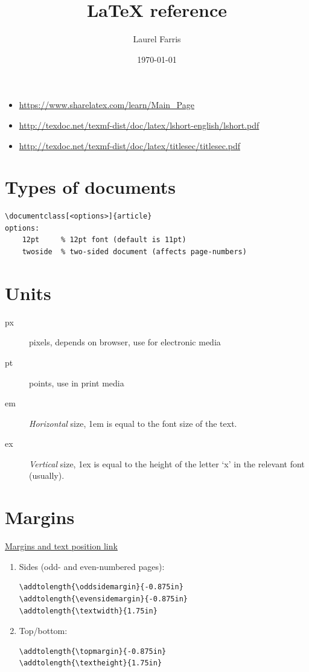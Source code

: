 \documentclass{article}
\title{LaTeX reference}
\author{Laurel Farris}
\date{\today}
\begin{document}
\maketitle
\begin{itemize}
    \item \url{https://www.sharelatex.com/learn/Main_Page}
    \item \url{http://texdoc.net/texmf-dist/doc/latex/lshort-english/lshort.pdf}
    \item \url{http://texdoc.net/texmf-dist/doc/latex/titlesec/titlesec.pdf}
\end{itemize}

\setlength{\columnsep}{30pt}
\setcounter{tocdepth}{1}
\setlength{\parskip}{2pt}
    \tableofcontents
\clearpage


\section{Types of documents}
\begin{lstlisting}
\documentclass[<options>]{article}
options:
    12pt     % 12pt font (default is 11pt)
    twoside  % two-sided document (affects page-numbers)
\end{lstlisting}

\section{Units}
\begin{description}
    \item [px] pixels, depends on browser, use for electronic media
    \item [pt] points, use in print media
    \item [em] \emph{Horizontal} size, 1em is equal to the font size of
        the text.
    \item [ex] \emph{Vertical} size, 1ex is equal to the height of the
        letter `x' in the relevant font (usually).
\end{description}


\section{Margins}
\href{https://tex.stackexchange.com/questions/42371/margins-and-text-position}
{Margins and text position link}
\begin{enumerate}
    \item Sides (odd- and even-numbered pages):
\begin{lstlisting}
\addtolength{\oddsidemargin}{-0.875in}
\addtolength{\evensidemargin}{-0.875in}
\addtolength{\textwidth}{1.75in}
\end{lstlisting}
    \item Top/bottom:
\begin{lstlisting}
\addtolength{\topmargin}{-0.875in}
\addtolength{\textheight}{1.75in}
\end{lstlisting}
\end{enumerate}
\end{document}
